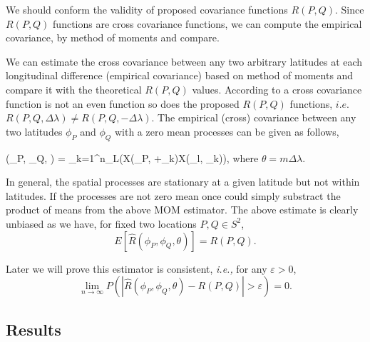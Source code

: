 	We should conform the validity of proposed covariance functions $R(P,Q)$. Since $R(P,Q)$ functions are cross covariance functions, we can compute the empirical covariance, by method of moments and compare.
	
	We can estimate the cross covariance between any two arbitrary latitudes at each longitudinal difference (empirical covariance) based on method of moments and compare it with the theoretical $R(P,Q)$ values. According to \cite{Wackernagel2013} a cross covariance function is not an even function so does the proposed $R(P,Q)$ functions, $i.e.$ $R(P,Q, \Delta\lambda) \ne R(P,Q,-\Delta\lambda)$. The empirical (cross) covariance between any two latitudes $\phi_P$ and $\phi_Q$ with a zero mean processes can be given as follows,
	
	\beq \label{emprical_var}
	(\phi_P, \phi_Q, \theta) = \sum_{k=1}^{n_L}(X(\phi_P, \theta+\lambda_k)\cdot X(\phi_l, \lambda_k)),
	\eeq
	where $\theta = m\Delta\lambda$.
	
	In general, the spatial processes are stationary at a given latitude but not within latitudes. If the processes are not zero mean once could simply substract the product of means from the above MOM estimator. The above estimate is clearly unbiased as we have, for fixed two locations $P, Q \in S^2$,
	\[
		E[\hat{R}(\phi_P, \phi_Q, \theta)] = R(P,Q).
	\]
	
	Later we will prove this estimator is consistent, {\em i.e.,} for any $\varepsilon > 0$,
	\[
		\lim_{n \to \infty} P(|\hat{R}(\phi_P, \phi_Q, \theta) - R(P,Q)| > \varepsilon) = 0.
	\]
	
	
	\subsection{Results}
	
	
